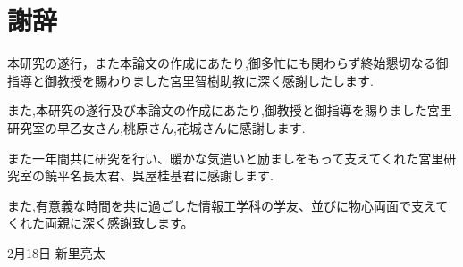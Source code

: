 \chapter*{謝辞}
\thispagestyle{empty}


\hspace{1zw}本研究の遂行，また本論文の作成にあたり,御多忙にも関わらず終始懇切なる御指導と御教授を賜わりました宮里智樹助教に深く感謝したします.

また,本研究の遂行及び本論文の作成にあたり,御教授と御指導を賜りました宮里研究室の早乙女さん,桃原さん,花城さんに感謝します.

また一年間共に研究を行い、暖かな気遣いと励ましをもって支えてくれた宮里研究室の饒平名長太君、呉屋桂基君に感謝します.

また,有意義な時間を共に過ごした情報工学科の学友、並びに物心両面で支えてくれた両親に深く感謝致します。



\begin{flushright}
2月18日 新里亮太
\end{flushright}


